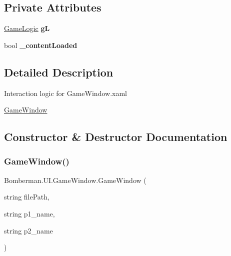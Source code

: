 \subsection*{Private Attributes}
\begin{DoxyCompactItemize}
\item 
\mbox{\label{class_bomberman_1_1_u_i_1_1_game_window_a3596d11f9f7e2af536ebf24e53c142b0}} 
\mbox{\hyperlink{class_bomberman_1_1_business_logic_1_1_game_logic}{Game\+Logic}} {\bfseries gL}
\item 
\mbox{\label{class_bomberman_1_1_u_i_1_1_game_window_a79e842b4a8e61a3444f5919e4d9a3a95}} 
bool {\bfseries \+\_\+content\+Loaded}
\end{DoxyCompactItemize}


\subsection{Detailed Description}
Interaction logic for Game\+Window.\+xaml 

\mbox{\hyperlink{class_bomberman_1_1_u_i_1_1_game_window}{Game\+Window}}

\subsection{Constructor \& Destructor Documentation}
\mbox{\label{class_bomberman_1_1_u_i_1_1_game_window_aa424bf59af30c6903af202f0aa6ef123}} 
\subsubsection{\texorpdfstring{GameWindow()}{GameWindow()}}
{\footnotesize\ttfamily Bomberman.\+U\+I.\+Game\+Window.\+Game\+Window (\begin{DoxyParamCaption}\item[{string}]{file\+Path,  }\item[{string}]{p1\+\_\+name,  }\item[{string}]{p2\+\_\+name }\end{DoxyParamCaption})\hspace{0.3cm}{\ttfamily [inline]}}



